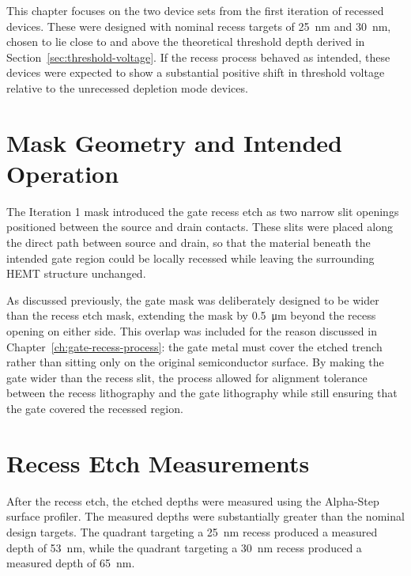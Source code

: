 \vspace{1mm}

This chapter focuses on the two device sets from the first
iteration of recessed devices. These were designed with nominal recess targets
of \SI{25}{\nano\metre} and \SI{30}{\nano\metre}, chosen to lie close to and
above the theoretical threshold depth derived in
Section~\ref{sec:threshold-voltage}. If the recess process behaved as intended,
these devices were expected to show a substantial positive shift in threshold
voltage relative to the unrecessed depletion mode devices.

\vspace{2mm}

\section{Mask Geometry and Intended Operation}

The Iteration 1 mask introduced the gate recess etch as two narrow slit
openings positioned between the source and drain contacts. These slits were
placed along the direct path between source and drain, so that the
material beneath the intended gate region could be locally recessed while
leaving the surrounding HEMT structure unchanged.

\vspace{1mm}

As discussed previously, the gate mask was deliberately designed to be wider 
than the recess etch mask, extending the mask by \SI{0.5}{\micro\metre} 
beyond the recess opening on either side. 
This overlap was included for the reason discussed in
Chapter~\ref{ch:gate-recess-process}: the gate metal must cover the etched
trench rather than sitting only on the original semiconductor surface. By
making the gate wider than the recess slit, the process allowed for alignment
tolerance between the recess lithography and the gate lithography while still
ensuring that the gate covered the recessed region.

\vspace{4mm}



\vspace{1mm}

\section{Recess Etch Measurements}

After the recess etch, the etched depths were measured using the Alpha-Step
surface profiler. The measured depths were substantially greater than the
nominal design targets. The quadrant targeting a
\SI{25}{\nano\metre} recess produced a measured depth of
\SI{53}{\nano\metre}, while the quadrant targeting a
\SI{30}{\nano\metre} recess produced a measured depth of
\SI{65}{\nano\metre}.

